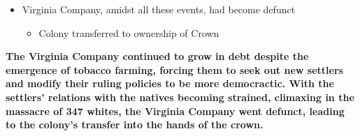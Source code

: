 \documentclass[a4paper]{article}
\begin{document}
{\begin{itemize}
\begin{itemize}
\begin{itemize}
                \item Called settlers for trading, massacring 347 whites of all ages, sexes
                \item Failed uprising later pushed Powhatans to finally give up
            \end{itemize}
        \end{itemize}
        \item Virginia Company, amidst all these events, had become defunct
        \begin{itemize}
            \item Colony transferred to ownership of Crown
        \end{itemize}
    \end{itemize}
    \textbf{The Virginia Company continued to grow in debt despite the emergence of tobacco farming, forcing them to seek out new settlers and modify their ruling policies to be more democractic. With the settlers' relations with the natives becoming strained, climaxing in the massacre of 347 whites, the Virginia Company went defunct, leading to the colony's transfer into the hands of the crown.}}
\end{document}
